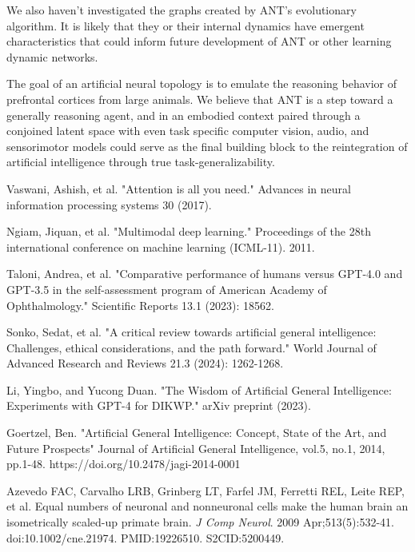 \documentclass{article}
\begin{document}
\begin{multicols}{2}
	We also haven't investigated the graphs created by ANT's evolutionary algorithm. It is likely that they or their internal dynamics have emergent characteristics that could inform future development of ANT or other learning dynamic networks.
	
	The goal of an artificial neural topology is to emulate the reasoning behavior of prefrontal cortices from large animals. We believe that ANT is a step toward a generally reasoning agent, and in an embodied context paired through a conjoined latent space with even task specific computer vision, audio, and sensorimotor models could serve as the final building block to the reintegration of artificial intelligence through true task-generalizability.

\begin{thebibliography}{11}

 Vaswani, Ashish, et al. "Attention is all you need." Advances in neural information processing systems 30 (2017). 

 Ngiam, Jiquan, et al. "Multimodal deep learning." Proceedings of the 28th international conference on machine learning (ICML-11). 2011.

 Taloni, Andrea, et al. "Comparative performance of humans versus GPT-4.0 and GPT-3.5 in the self-assessment program of American Academy of Ophthalmology." Scientific Reports 13.1 (2023): 18562.

 Sonko, Sedat, et al. "A critical review towards artificial general intelligence: Challenges, ethical considerations, and the path forward." World Journal of Advanced Research and Reviews 21.3 (2024): 1262-1268.

 Li, Yingbo, and Yucong Duan. "The Wisdom of Artificial General Intelligence: Experiments with GPT-4 for DIKWP." arXiv preprint (2023).

 Goertzel, Ben. "Artificial General Intelligence: Concept, State of the Art, and Future Prospects" Journal of Artificial General Intelligence, vol.5, no.1, 2014, pp.1-48. https://doi.org/10.2478/jagi-2014-0001

Azevedo FAC, Carvalho LRB, Grinberg LT, Farfel JM, Ferretti REL, Leite REP, et al. 
Equal numbers of neuronal and nonneuronal cells make the human brain an isometrically scaled-up primate brain. 
\textit{J Comp Neurol}. 2009 Apr;513(5):532-41. 
doi:10.1002/cne.21974. PMID:19226510. S2CID:5200449.


\end{thebibliography}
\end{multicols}
\end{document}
